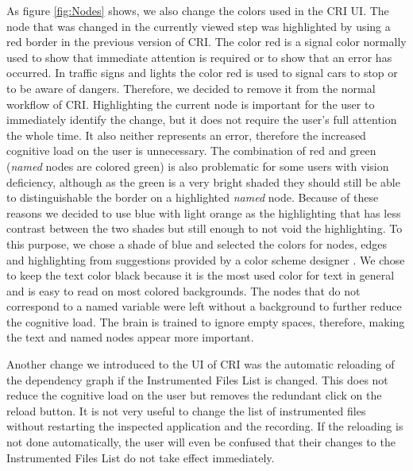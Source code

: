 As figure \ref{fig:Nodes} shows, we also change the colors used in the CRI UI. The node that was changed in the currently viewed step was highlighted by using a red border in the previous version of CRI. The color red is a signal color normally used to show that immediate attention is required or to show that an error has occurred. In traffic signs and lights the color red is used to signal cars to stop or to be aware of dangers. Therefore, we decided to remove it from the normal workflow of CRI. Highlighting the current node is important for the user to immediately identify the change, but it does not require the user's full attention the whole time. It also neither represents an error, therefore the increased cognitive load on the user is unnecessary. The combination of red and green (\emph{named} nodes are colored green) is also problematic for some users with vision deficiency, although as the green is a very bright shaded they should still be able to distinguishable the border on a highlighted \emph{named} node. Because of these reasons we decided to use blue with light orange as the highlighting that has less contrast between the two shades but still enough to not void the highlighting. To this purpose, we chose a shade of blue and selected the colors for nodes, edges and highlighting from suggestions provided by a color scheme designer \cite{Paletton}. We chose to keep the text color black because it is the most used color for text in general and is easy to read on most colored backgrounds. The nodes that do not correspond to a named variable were left without a background to further reduce the cognitive load. The brain is trained to ignore empty spaces, therefore, making the text and named nodes appear more important.

Another change we introduced to the UI of CRI was the automatic reloading of the dependency graph if the Instrumented Files List is changed. This does not reduce the cognitive load on the user but removes the redundant click on the reload button. It is not very useful to change the list of instrumented files without restarting the inspected application and the recording. If the reloading is not done automatically, the user will even be confused that their changes to the Instrumented Files List do not take effect immediately.
	
